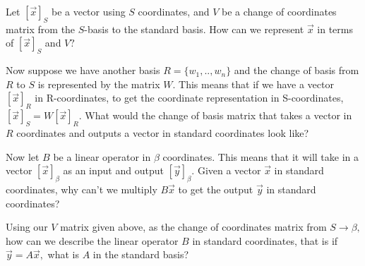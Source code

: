   \begin{enumerate}[resume]
  \qitem Let $[\vec{x}]_S$ be a vector using $S$ coordinates, and $V$ be a change of coordinates matrix from the $S$-basis to the standard basis. How can we represent $\vec{x}$ in terms of $[\vec{x}]_S$ and $V?$


  \qitem Now suppose we have another basis $R = \{w_1, .. , w_n\}$ and the change of basis from $R$ to $S$ is represented by the matrix $W.$ This means that if we have a vector $[\vec{x}]_R$ in R-coordinates, to get the coordinate representation in S-coordinates, $[\vec{x}]_S = W[\vec{x}]_R.$ What would the change of basis matrix that takes a vector in $R$ coordinates and outputs a vector in standard coordinates look like?

  \qitem Now let $B$ be a linear operator in $\beta$ coordinates. This means that it will take in a vector $[\vec{x}]_\beta$ as an input and output $[\vec{y}]_\beta.$ Given a vector $\vec{x}$ in standard coordinates, why can't we multiply $B \vec{x}$ to get the output $\vec{y}$ in standard coordinates?


  \qitem Using our $V$ matrix given above, as the change of coordinates matrix from $S \to \beta,$ how can we describe the linear operator $B$ in standard coordinates, that is if $\vec{y} = A \vec{x},$ what is $A$ in the standard basis?


\end{enumerate}
